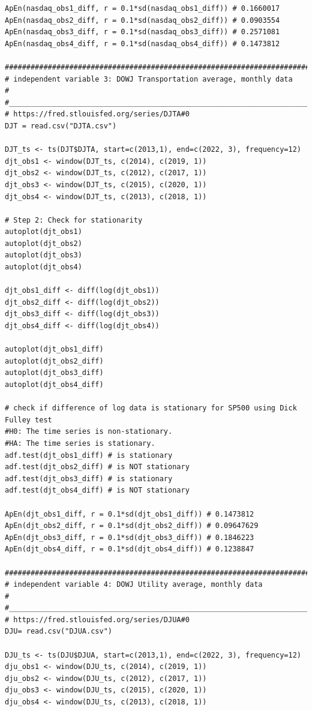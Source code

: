 \documentclass{article}[12pt]
\begin{document}
\begin{appendices}
\begin{lstlisting}
ApEn(nasdaq_obs1_diff, r = 0.1*sd(nasdaq_obs1_diff)) # 0.1660017
ApEn(nasdaq_obs2_diff, r = 0.1*sd(nasdaq_obs2_diff)) # 0.0903554
ApEn(nasdaq_obs3_diff, r = 0.1*sd(nasdaq_obs3_diff)) # 0.2571081
ApEn(nasdaq_obs4_diff, r = 0.1*sd(nasdaq_obs4_diff)) # 0.1473812

################################################################################
# independent variable 3: DOWJ Transportation average, monthly data            #
#______________________________________________________________________________#
# https://fred.stlouisfed.org/series/DJTA#0
DJT = read.csv("DJTA.csv")

DJT_ts <- ts(DJT$DJTA, start=c(2013,1), end=c(2022, 3), frequency=12)
djt_obs1 <- window(DJT_ts, c(2014), c(2019, 1))
djt_obs2 <- window(DJT_ts, c(2012), c(2017, 1))
djt_obs3 <- window(DJT_ts, c(2015), c(2020, 1))
djt_obs4 <- window(DJT_ts, c(2013), c(2018, 1))

# Step 2: Check for stationarity
autoplot(djt_obs1)
autoplot(djt_obs2)
autoplot(djt_obs3)
autoplot(djt_obs4)

djt_obs1_diff <- diff(log(djt_obs1))
djt_obs2_diff <- diff(log(djt_obs2))
djt_obs3_diff <- diff(log(djt_obs3))
djt_obs4_diff <- diff(log(djt_obs4))

autoplot(djt_obs1_diff)
autoplot(djt_obs2_diff)
autoplot(djt_obs3_diff)
autoplot(djt_obs4_diff)

# check if difference of log data is stationary for SP500 using Dick Fulley test
#H0: The time series is non-stationary.
#HA: The time series is stationary.
adf.test(djt_obs1_diff) # is stationary
adf.test(djt_obs2_diff) # is NOT stationary
adf.test(djt_obs3_diff) # is stationary
adf.test(djt_obs4_diff) # is NOT stationary

ApEn(djt_obs1_diff, r = 0.1*sd(djt_obs1_diff)) # 0.1473812
ApEn(djt_obs2_diff, r = 0.1*sd(djt_obs2_diff)) # 0.09647629
ApEn(djt_obs3_diff, r = 0.1*sd(djt_obs3_diff)) # 0.1846223
ApEn(djt_obs4_diff, r = 0.1*sd(djt_obs4_diff)) # 0.1238847

################################################################################
# independent variable 4: DOWJ Utility average, monthly data                   #
#______________________________________________________________________________#
# https://fred.stlouisfed.org/series/DJUA#0
DJU= read.csv("DJUA.csv")

DJU_ts <- ts(DJU$DJUA, start=c(2013,1), end=c(2022, 3), frequency=12)
dju_obs1 <- window(DJU_ts, c(2014), c(2019, 1))
dju_obs2 <- window(DJU_ts, c(2012), c(2017, 1))
dju_obs3 <- window(DJU_ts, c(2015), c(2020, 1))
dju_obs4 <- window(DJU_ts, c(2013), c(2018, 1))


\end{lstlisting}
\end{appendices}
\end{document}
